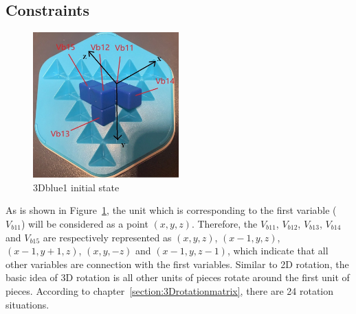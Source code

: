 \subsection{Constraints}
\begin{figure}[htbp]
\centering
\includegraphics[width=0.5\textwidth]{figs/3Drotateexplain.jpg}
\caption{3Dblue1 initial state}
\label{fig:3Dblue1explanation}
\end{figure}
As is shown in Figure~\ref{fig:3Dblue1explanation}, the unit which is corresponding to the first variable ($V_{b11}$) will be considered as a point $(x,y,z)$. Therefore, the $V_{b11}$, $V_{b12}$, $V_{b13}$, $V_{b14}$ and $V_{b15}$ are respectively represented as $(x,y,z)$, $(x-1,y,z)$, $(x-1,y+1,z)$, $(x,y,-z)$ and $(x-1,y,z-1)$, which indicate that all other variables are connection with the first variables. Similar to 2D rotation, the basic idea of 3D rotation is all other units of pieces rotate around the first unit of pieces. According to chapter~\ref{section:3Drotationmatrix}, there are 24 rotation situations.